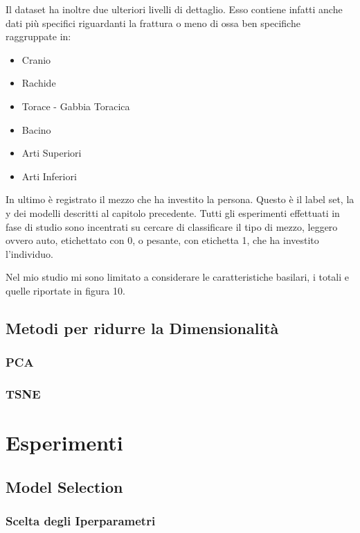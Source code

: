 \documentclass[12pt,italian]{report}
\begin{document}
Il dataset ha inoltre due ulteriori livelli di dettaglio. Esso contiene infatti anche dati più specifici riguardanti la frattura o meno di ossa ben specifiche raggruppate in:
\begin{itemize}
	\item Cranio
	\item Rachide
	\item Torace - Gabbia Toracica
	\item Bacino
	\item Arti Superiori
	\item Arti Inferiori
\end{itemize}
In ultimo è registrato il mezzo che ha investito la persona. Questo è il label set, la y dei modelli descritti al capitolo precedente. Tutti gli esperimenti effettuati in fase di studio sono incentrati su cercare di classificare il tipo di mezzo, leggero ovvero auto, etichettato con 0, o pesante, con etichetta 1, che ha investito l'individuo.

Nel mio studio mi sono limitato a considerare le caratteristiche basilari, i totali e quelle riportate in figura 10.
\section{Metodi per ridurre la Dimensionalità}



\subsection{PCA}
\subsection{TSNE}


% 
% 

\chapter{Esperimenti}
\label{cap3}



\section{Model Selection}

\subsection{Scelta degli Iperparametri}
\end{document}
